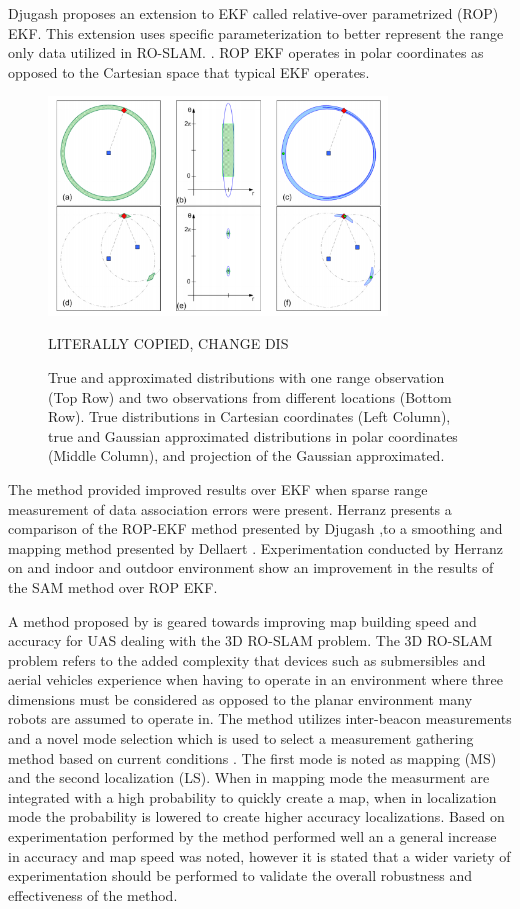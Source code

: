 \documentclass[conference]{IEEEtran}
\begin{document}
Djugash proposes an extension to EKF called relative-over parametrized (ROP) EKF. This extension uses specific parameterization to  better represent the range only data utilized in RO-SLAM. \cite{Djugash2008}. ROP EKF operates in polar coordinates as opposed to the Cartesian space that typical EKF operates.
\begin{figure}[h!]
	\centering
	\includegraphics[width=90mm]{ROP_djugash.png}
	\caption{True and approximated distributions with one range observation (Top Row) and two observations from different locations (Bottom Row). True distributions in	Cartesian coordinates (Left Column), true and Gaussian approximated distributions in polar coordinates (Middle Column), and projection of the Gaussian approximated. \cite{Djugash2008}} LITERALLY COPIED, CHANGE DIS%
	\label{ROP_djugash}
\end{figure}
\FloatBarrier

The method provided improved results over EKF when sparse range measurement of data association errors were present. Herranz presents a comparison of the ROP-EKF method presented by Djugash \cite{Djugash2008},to a smoothing and mapping method presented by Dellaert \cite{Dellaert2006}. Experimentation conducted by Herranz on and indoor and outdoor environment show an improvement in the results of the SAM method over ROP EKF. \cite{Herranz2014}

A method proposed by \cite{Dios2015} is geared towards improving map building speed and accuracy for UAS dealing with the 3D RO-SLAM problem. The 3D RO-SLAM problem refers to the added complexity that devices such as submersibles \cite{Newman} and aerial vehicles experience when having to operate in an environment where three dimensions must be considered as opposed to the planar environment many robots are assumed to operate in. The method utilizes inter-beacon measurements and a novel mode selection which is used to select a measurement gathering method based on current conditions \cite{Dios2015}. The first mode is noted as mapping (MS) and the second localization (LS). When in mapping mode the measurment are integrated with a high probability to quickly create a map, when in localization mode the probability is lowered to create higher accuracy localizations. Based on experimentation performed by \cite{Dios2015} the method performed well an a general increase in accuracy and map speed was noted, however it is stated that a wider variety of experimentation should be performed to validate the overall robustness and effectiveness of the method.
\end{document}
